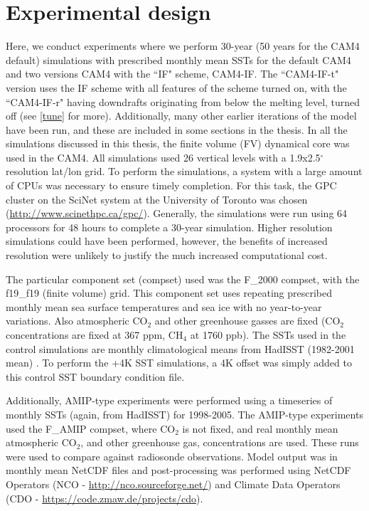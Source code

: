 \documentclass[letterpaper,12pt,titlepage,oneside,final]{book}
\begin{document}
\section{Experimental design}

Here, we conduct experiments where we perform 30-year (50 years for the CAM4 default) simulations with prescribed monthly mean SSTs for the default CAM4 and two versions CAM4 with the ``IF" scheme, CAM4-IF. The ``CAM4-IF-t" version uses the IF scheme with all features of the scheme turned on, with the ``CAM4-IF-r" having downdrafts originating from below the melting level, turned off (see \ref{tune} for more). Additionally, many other earlier iterations of the model have been run, and these are included in some sections in the thesis. In all the simulations discussed in this thesis, the finite volume (FV) dynamical core was used in the CAM4. All simulations used 26 vertical levels with a 1.9x2.5$^{\circ}$ resolution lat/lon grid. To perform the simulations, a system with a large amount of CPUs was necessary to ensure timely completion. For this task, the GPC cluster on the SciNet system at the University of Toronto was chosen (\url{http://www.scinethpc.ca/gpc/}). Generally, the simulations were run using 64 processors for 48 hours to complete a 30-year simulation. Higher resolution simulations could have been performed, however, the benefits of increased resolution were unlikely to justify the much increased computational cost.

The particular component set (compset) used was the F\_2000 compset, with the f19\_f19 (finite volume) grid. This component set uses repeating prescribed monthly mean sea surface temperatures and sea ice with no year-to-year variations. Also atmospheric CO$_{2}$ and other greenhouse gasses are fixed (CO$_{2}$ concentrations are fixed at 367 ppm, CH$_{4}$ at 1760 ppb). The SSTs used in the control simulations are monthly climatological means from HadISST (1982-2001 mean) \citep{hurrell_new_2008}. To perform the +4K SST simulations, a 4K offset was simply added to this control SST boundary condition file.

Additionally, AMIP-type experiments \citep{taylor_overview_2011} were performed using a timeseries of monthly SSTs (again, from HadISST) for 1998-2005. The AMIP-type experiments used the F\_AMIP compset, where CO$_{2}$ is not fixed, and real monthly mean atmospheric CO$_{2}$, and other greenhouse gas, concentrations are used. These runs were used to compare against radiosonde observations. Model output was in monthly mean NetCDF files and post-processing was performed using NetCDF Operators (NCO - \url{http://nco.sourceforge.net/}) and Climate Data Operators (CDO - \url{https://code.zmaw.de/projects/cdo}).
\end{document}
